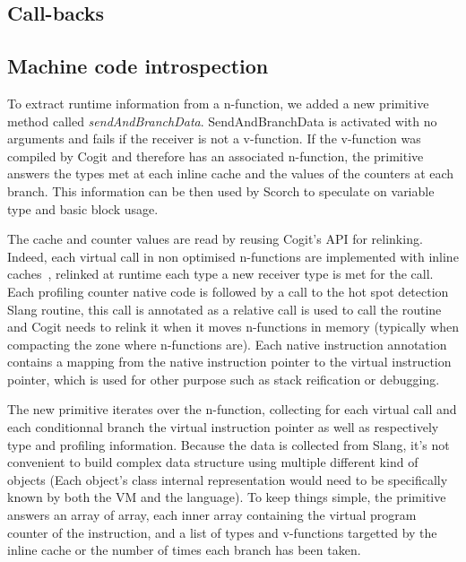 \documentclass[a4paper,12pt,twoside]{../includes/ThesisStyle}
\begin{document}
\subsection{Call-backs}





\subsection{Machine code introspection}

To extract runtime information from a n-function, we added a new primitive method called \emph{sendAndBranchData}. SendAndBranchData is activated with no arguments and fails if the receiver is not a v-function. If the v-function was compiled by Cogit and therefore has an associated n-function, the primitive answers the types met at each inline cache and the values of the counters at each branch. This information can be then used by Scorch to speculate on variable type and basic block usage. 

The cache and counter values are read by reusing Cogit's API for relinking. Indeed, each virtual call in non optimised n-functions are implemented with inline caches~\cite{Deut84a,Holz91a}, relinked at runtime each type a new receiver type is met for the call. Each profiling counter native code is followed by a call to the hot spot detection Slang routine, this call is annotated as a relative call is used to call the routine and Cogit needs to relink it when it moves n-functions in memory (typically when compacting the zone where n-functions are). Each native instruction annotation contains a mapping from the native instruction pointer to the virtual instruction pointer, which is used for other purpose such as stack reification or debugging.

The new primitive iterates over the n-function, collecting for each virtual call and each conditionnal branch the virtual instruction pointer as well as respectively type and profiling information. Because the data is collected from Slang, it's not convenient to build complex data structure using multiple different kind of objects (Each object's class internal representation would need to be specifically known by both the VM and the language). To keep things simple, the primitive answers an array of array, each inner array containing the virtual program counter of the instruction, and a list of types and v-functions targetted by the inline cache or the number of times each branch has been taken.
\end{document}
